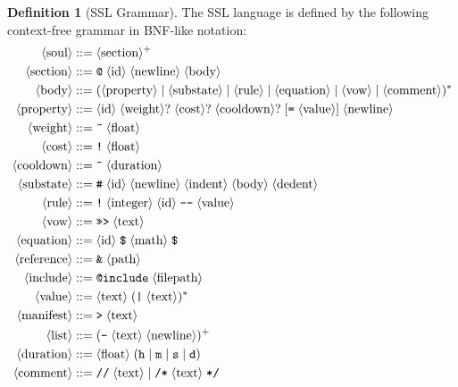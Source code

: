\documentclass[12pt,a4paper]{article}
\theoremstyle{plain}
\theoremstyle{definition}
\newtheorem{definition}[theorem]{Definition}
\theoremstyle{remark}
\begin{document}
\begin{definition}[SSL Grammar]
The SSL language is defined by the following context-free grammar in BNF-like notation:
\begin{align*}
\langle\text{soul}\rangle &::= \langle\text{section}\rangle^+ \\
\langle\text{section}\rangle &::= \texttt{@}\;\langle\text{id}\rangle\;\langle\text{newline}\rangle\;\langle\text{body}\rangle \\
\langle\text{body}\rangle &::= (\langle\text{property}\rangle \mid \langle\text{substate}\rangle \mid \langle\text{rule}\rangle \mid \langle\text{equation}\rangle \mid \langle\text{vow}\rangle \mid \langle\text{comment}\rangle)^* \\
\langle\text{property}\rangle &::= \langle\text{id}\rangle\;\langle\text{weight}\rangle?\;\langle\text{cost}\rangle?\;\langle\text{cooldown}\rangle?\;[\texttt{=}\;\langle\text{value}\rangle]\;\langle\text{newline}\rangle \\
\langle\text{weight}\rangle &::= \texttt{\~{}}\;\langle\text{float}\rangle \\
\langle\text{cost}\rangle &::= \texttt{!}\;\langle\text{float}\rangle \\
\langle\text{cooldown}\rangle &::= \texttt{\~{}}\;\langle\text{duration}\rangle \\
\langle\text{substate}\rangle &::= \texttt{\#}\;\langle\text{id}\rangle\;\langle\text{newline}\rangle\;\langle\text{indent}\rangle\;\langle\text{body}\rangle\;\langle\text{dedent}\rangle \\
\langle\text{rule}\rangle &::= \texttt{!}\;\langle\text{integer}\rangle\;\langle\text{id}\rangle\;\texttt{---}\;\langle\text{value}\rangle \\
\langle\text{vow}\rangle &::= \texttt{>>>}\;\langle\text{text}\rangle \\
\langle\text{equation}\rangle &::= \langle\text{id}\rangle\;\texttt{\$}\;\langle\text{math}\rangle\;\texttt{\$} \\
\langle\text{reference}\rangle &::= \texttt{\&}\;\langle\text{path}\rangle \\
\langle\text{include}\rangle &::= \texttt{@include}\;\langle\text{filepath}\rangle \\
\langle\text{value}\rangle &::= \langle\text{text}\rangle\;(\texttt{|}\;\langle\text{text}\rangle)^* \\
\langle\text{manifest}\rangle &::= \texttt{>}\;\langle\text{text}\rangle \\
\langle\text{list}\rangle &::= (\texttt{-}\;\langle\text{text}\rangle\;\langle\text{newline}\rangle)^+ \\
\langle\text{duration}\rangle &::= \langle\text{float}\rangle\;(\texttt{h} \mid \texttt{m} \mid \texttt{s} \mid \texttt{d}) \\
\langle\text{comment}\rangle &::= \texttt{//}\;\langle\text{text}\rangle \mid \texttt{/*}\;\langle\text{text}\rangle\;\texttt{*/}
\end{align*}
\end{definition}
\end{document}
